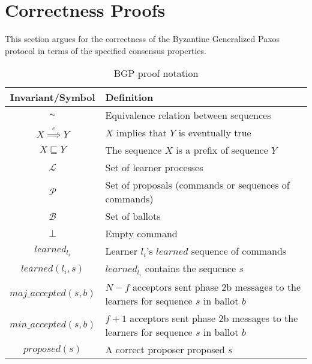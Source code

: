 \section{Correctness Proofs} \label{bft_proof}

This section argues for the correctness of the Byzantine Generalized Paxos protocol in terms of the specified consensus properties.\par

\begin{table}[h!]
	\renewcommand{\arraystretch}{1.5}
	\centering
	\begin{tabularx}{\linewidth}{ |c|X|}
		\hline
		Invariant/Symbol & Definition \\
		\hline
		$\thicksim$ & Equivalence relation between sequences \\
		\hline
		$X \overset{e}{\implies} Y$ & $X$ implies that $Y$ is eventually true \\
		\hline
		$X \sqsubseteq Y$ & The sequence $X$ is a prefix of sequence $Y$ \\
		\hline
		$\mathcal{L}$ & Set of learner processes \\
		\hline
		$\mathcal{P}$ & Set of proposals (commands or sequences of commands) \\
		\hline
		$\mathcal{B}$ & Set of ballots \\
		\hline
		$\bot$ & Empty command \\
		\hline		
		$learned_{l_i}$ & Learner $l_i$'s $learned$ sequence of commands \\
		\hline
		$learned(l_i,s)$ & $learned_{l_i}$ contains the sequence $s$ \\
		\hline
		$maj\_accepted(s,b)$ & $N-f$ acceptors sent phase 2b messages to the learners for sequence $s$ in ballot $b$ \\
		\hline
		$min\_accepted(s,b)$ & $f+1$ acceptors sent phase 2b messages to the learners for sequence $s$ in ballot $b$\\
		\hline
		$proposed(s)$ & A correct proposer proposed $s$ \\
		\hline
		
	\end{tabularx} 
	\vspace{\smallskipamount}
	\caption{BGP proof notation} 
	\label{table:bft_proof}
\end{table}

